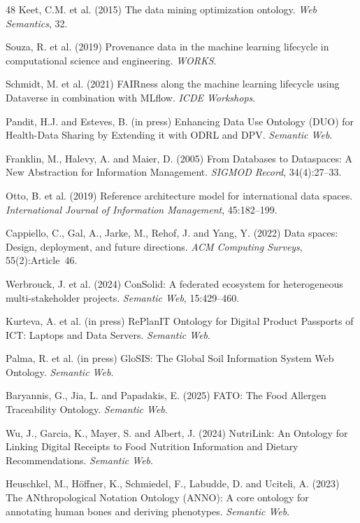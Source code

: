 \documentclass[11pt,a4paper]{article}
\begin{document}
\begin{thebibliography}{48}
 Keet, C.M. et al. (2015) The data mining optimization ontology. \emph{Web Semantics}, 32.

 Souza, R. et al. (2019) Provenance data in the machine learning lifecycle in computational science and engineering. \emph{WORKS}.

 Schmidt, M. et al. (2021) FAIRness along the machine learning lifecycle using Dataverse in combination with MLflow. \emph{ICDE Workshops}.

 Pandit, H.J. and Esteves, B. (in press) Enhancing Data Use Ontology (DUO) for Health-Data Sharing by Extending it with ODRL and DPV. \emph{Semantic Web}.

 Franklin, M., Halevy, A. and Maier, D. (2005) From Databases to Dataspaces: A New Abstraction for Information Management. \emph{SIGMOD Record}, 34(4):27--33.

 Otto, B. et al. (2019) Reference architecture model for international data spaces. \emph{International Journal of Information Management}, 45:182--199.

 Cappiello, C., Gal, A., Jarke, M., Rehof, J. and Yang, Y. (2022) Data spaces: Design, deployment, and future directions. \emph{ACM Computing Surveys}, 55(2):Article~46.

 Werbrouck, J. et al. (2024) ConSolid: A federated ecosystem for heterogeneous multi-stakeholder projects. \emph{Semantic Web}, 15:429--460.

 Kurteva, A. et al. (in press) RePlanIT Ontology for Digital Product Passports of ICT: Laptops and Data Servers. \emph{Semantic Web}.

 Palma, R. et al. (in press) GloSIS: The Global Soil Information System Web Ontology. \emph{Semantic Web}.

 Baryannis, G., Jia, L. and Papadakis, E. (2025) FATO: The Food Allergen Traceability Ontology. \emph{Semantic Web}.

 Wu, J., Garcia, K., Mayer, S. and Albert, J. (2024) NutriLink: An Ontology for Linking Digital Receipts to Food Nutrition Information and Dietary Recommendations. \emph{Semantic Web}.

 Heuschkel, M., H\"offner, K., Schmiedel, F., Labudde, D. and Uciteli, A. (2023) The ANthropological Notation Ontology (ANNO): A core ontology for annotating human bones and deriving phenotypes. \emph{Semantic Web}.


\end{thebibliography}
\end{document}
